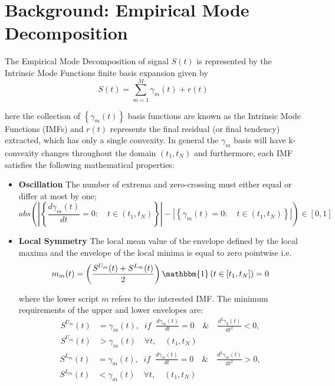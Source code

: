 \section{Background: Empirical Mode Decomposition}\label{sec:EMD_background}


\begin{Definition}

The Empirical Mode Decomposition of signal $S(t)$ is represented by the Intrinsic Mode Functions finite basis expansion given by
\begin{equation}
\label{EMD-for}
S(t) = \sum_{m=1}^M \gamma_m \left(t\right) + r \left(t \right)
\end{equation}

here the collection of $\left\{\gamma_m(t)\right\}$ basis functions are known as the Intrinsic Mode Functions (IMFs) and $r \left(t \right)$ represents the final residual (or final tendency) extracted, which has only a single convexity. In general the $\gamma_m$ basis will have k-convexity changes throughout the domain $(t_1, t_N)$ and furthermore, each IMF satisfies the following mathematical properties:
\begin{itemize}
\item \textbf{Oscillation} The number of extrema and zero-crossing must either equal or differ at most by one;
\begin{equation}
abs \left( \left| \left\{ \frac{d \gamma_m (t)}{dt} = 0 : \quad t \in \left( t_1, t_N \right) \right\} \right| - \left| \left\{ \gamma_m (t) = 0 : \quad t \in \left( t_1, t_N \right) \right\} \right| \right)  \in  \left[ 0, 1 \right]
\end{equation}
\item \textbf{Local Symmetry} The local mean value of the envelope defined by the local maxima and the envelope of the local minima is equal to zero pointwise i.e.   
\begin{equation}
\label{mean_env}
m_m(t) = \left(\frac{S^{U_m} (t) + S^{L_m} (t)}{2} \right) \mathbbm{1} \left( t \in [t_1, t_N] \right) = 0
\end{equation}

where the lower script $m$ refers to the interested IMF. The minimum requirements of the upper and lower envelopes are: 
\begin{equation}
\label{cond_1_sp}
\begin{split}
S^{U_m}(t) & =  \gamma_m(t), \; \; if \; \; \frac{d \gamma_m(t)}{dt} = 0 \quad \& \quad \frac{d^2 \gamma_k(t)}{d t^2} <0, \\
S^{U_m} (t) & > \gamma_m(t) \quad  \forall t, \quad (t_1, t_N)
\end{split}
\end{equation}
\begin{equation}
\label{cond_2_sp}
\begin{split}
S^{L_m} (t) & =  \gamma_m(t), \; \; if \; \; \frac{d \gamma_m(t)}{dt} = 0 \quad \& \quad \frac{d^2 \gamma_m(t)}{d t^2} > 0, \\
S^{L_m} (t) & < \gamma_m(t) \quad  \forall t, \quad (t_1, t_N)
\end{split}
\end{equation}
\end{itemize}
\end{Definition}